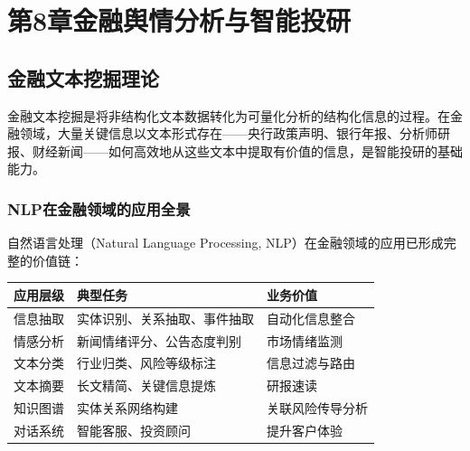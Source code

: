 
\chapter{第8章\quad 金融舆情分析与智能投研}

\section{金融文本挖掘理论}

金融文本挖掘是将非结构化文本数据转化为可量化分析的结构化信息的过程。在金融领域，大量关键信息以文本形式存在——央行政策声明、银行年报、分析师研报、财经新闻——如何高效地从这些文本中提取有价值的信息，是智能投研的基础能力。

\subsection{NLP在金融领域的应用全景}

自然语言处理（Natural Language Processing, NLP）在金融领域的应用已形成完整的价值链：

\begin{table}[H]
\centering
\begin{tabular}{lp{4cm}p{5cm}}
\toprule
\textbf{应用层级} & \textbf{典型任务} & \textbf{业务价值} \\
\midrule
信息抽取 & 实体识别、关系抽取、事件抽取 & 自动化信息整合 \\
情感分析 & 新闻情绪评分、公告态度判别 & 市场情绪监测 \\
文本分类 & 行业归类、风险等级标注 & 信息过滤与路由 \\
文本摘要 & 长文精简、关键信息提炼 & 研报速读 \\
知识图谱 & 实体关系网络构建 & 关联风险传导分析 \\
对话系统 & 智能客服、投资顾问 & 提升客户体验 \\
\bottomrule
\end{tabular}
\end{table}

